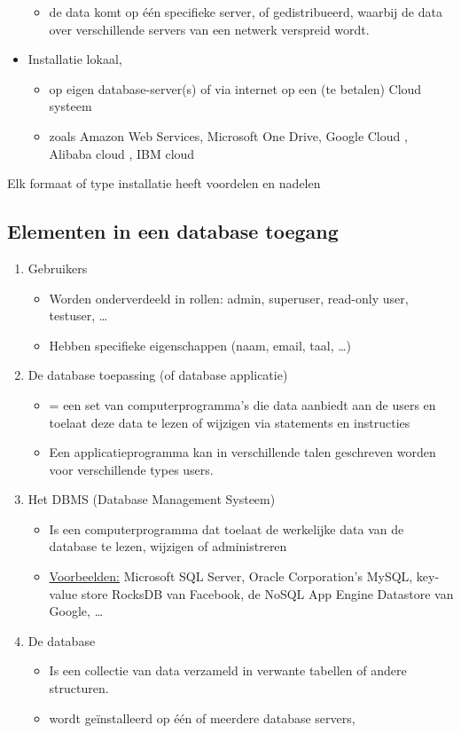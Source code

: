 \documentclass{article}
\begin{document}
\begin{itemize}
    \begin{itemize}
        \item de data komt op één specifieke server, of gedistribueerd, waarbij de data over verschillende servers van een netwerk verspreid wordt.
    \end{itemize}
    \item Installatie lokaal, 
    \begin{itemize}
        \item op eigen database-server(s) of via internet op een (te betalen) Cloud systeem
        \item zoals Amazon Web Services, Microsoft One Drive, Google Cloud , Alibaba cloud , IBM cloud
    \end{itemize}
\end{itemize}

Elk formaat of type installatie heeft voordelen en nadelen

\subsection{Elementen in een database toegang}

\begin{enumerate}
    \item Gebruikers
    \begin{itemize}
        \item Worden onderverdeeld in rollen: admin, superuser, read-only user, testuser, \dots
        \item Hebben specifieke eigenschappen (naam, email, taal, \dots)
    \end{itemize}
    \item De database toepassing (of database applicatie) 
    \begin{itemize}
        \item = een set van computerprogramma's die data aanbiedt aan de users en toelaat deze data te lezen of wijzigen via statements en instructies
        \item Een applicatieprogramma kan in verschillende talen geschreven worden voor verschillende types users.
    \end{itemize} 
    \item Het DBMS (Database Management Systeem)
    \begin{itemize}
        \item Is een computerprogramma dat toelaat de werkelijke data van de database te lezen, wijzigen of administreren
        \item \underline{Voorbeelden:} Microsoft SQL Server, Oracle Corporation's MySQL, key-value store RocksDB van Facebook, de NoSQL App Engine Datastore van Google, \dots
    \end{itemize}
    \item De database
    \begin{itemize}
        \item Is een collectie van data verzameld in verwante tabellen of andere structuren.
        \item wordt geïnstalleerd op één of meerdere database servers,
    \end{itemize}
\end{enumerate}
\end{document}
